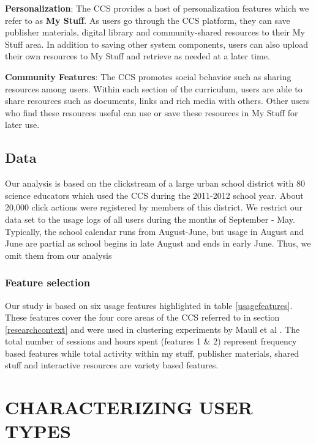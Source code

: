 \documentclass{acm_proc_article-sp}
\begin{document}
\textbf{Personalization}:
The CCS provides a host of personalization features which we refer to as \textbf{My Stuff}. As users go through the CCS platform, they can save publisher materials, digital library and community-shared resources to their My Stuff area. In addition to saving other system components, users can also upload their own resources to My Stuff and retrieve as needed at a later time.

\textbf{Community Features}:
The CCS promotes social behavior such as sharing resources among users. Within each section of the curriculum, users are able to share resources such as documents, links and rich media with others. Other users who find these resources useful can use or save these resources in My Stuff for later use.

\subsection{Data}
Our analysis is based on the clickstream of a large urban school district with 80 science educators which used the CCS during the 2011-2012 school year. About 20,000 click actions were registered by members of this district. We restrict our data set to the usage logs of all users during the months of September - May. Typically, the school calendar runs from August-June, but usage in August and June are partial as school begins in late August and ends in early June. Thus, we omit them from our analysis

\subsubsection{Feature selection}\label{usagefeaturesection}
Our study is based on six usage features highlighted in table \ref{usagefeatures}. These features cover the four core areas of the CCS referred to in section \ref{researchcontext} and were used in clustering experiments by Maull et al \cite{maullunderstanding}. The total number of sessions and hours spent (features 1 \& 2) represent frequency based features while total activity within my stuff, publisher materials, shared stuff and interactive resources are variety based features. 

\section{CHARACTERIZING USER TYPES}\label{charusertypes}
\end{document}
